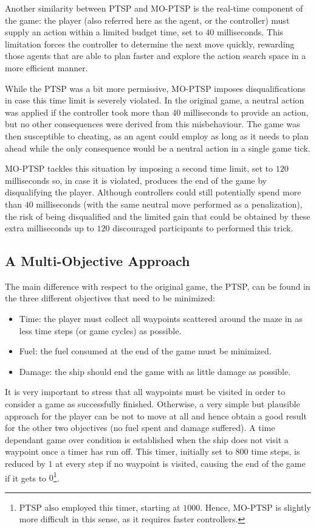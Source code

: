 \documentclass[conference]{IEEEtran}
\begin{document}
Another similarity between PTSP and MO-PTSP is the real-time component of the game: the player (also referred here as the agent, or the controller) must supply an action within a limited budget time, set to $40$ milliseconds. This limitation forces the controller to determine the next move quickly, rewarding those agents that are able to plan faster and explore the action search space in a more efficient manner.

While the PTSP was a bit more permissive, MO-PTSP imposes disqualifications in case this time limit is severely violated. In the original game, a neutral action was applied if the controller took more than $40$ milliseconds to provide an action, but no other consequences were derived from this misbehaviour. The game was then susceptible to cheating, as an agent could employ as long as it needs to plan ahead while the only consequence would be a neutral action in a single game tick. 

MO-PTSP tackles this situation by imposing a second time limit, set to $120$ milliseconds so, in case it is violated, produces the end of the game by disqualifying the player. Although controllers could still potentially spend more than $40$ milliseconds (with the same neutral move performed as a penalization), the risk of being disqualified and the limited gain that could be obtained by these extra milliseconds up to $120$ discouraged participants to performed this trick.

\subsection{A Multi-Objective Approach}

The main difference with respect to the original game, the PTSP, can be found in the three different objectives that need to be minimized:

\begin{itemize}
\item Time: the player must collect all waypoints scattered around the maze in as less time steps (or game cycles) as possible.
\item Fuel: the fuel consumed at the end of the game must be minimized.
\item Damage: the ship should end the game with as little damage as possible.
\end{itemize}

It is very important to stress that all waypoints must be visited in order to consider a game as successfully finished. Otherwise, a very simple but plausible approach for the player can be not to move at all and hence obtain a good result for the other two objectives (no fuel spent and damage suffered). A time dependant game over condition is established when the ship does not visit a waypoint once a timer has run off. This timer, initially set to $800$ time steps, is reduced by $1$ at every step if no waypoint is visited, causing the end of the game if it gets to $0$\footnote{PTSP also employed this timer, starting at $1000$. Hence, MO-PTSP is slightly more difficult in this sense, as it requires faster controllers.}. 
\end{document}
